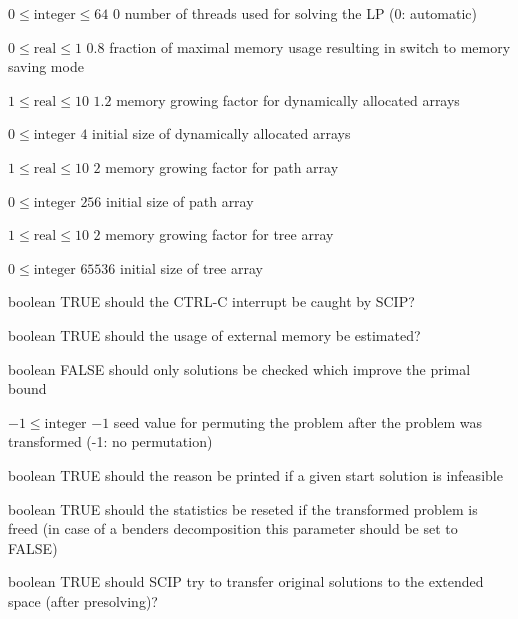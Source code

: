 %
{$0\leq\textrm{integer}\leq64$}%
{$0$}%
{number of threads used for solving the LP (0: automatic)}%
{}

%
{$0\leq\textrm{real}\leq1$}%
{$0.8$}%
{fraction of maximal memory usage resulting in switch to memory saving mode}%
{}

%
{$1\leq\textrm{real}\leq10$}%
{$1.2$}%
{memory growing factor for dynamically allocated arrays}%
{}

%
{$0\leq\textrm{integer}$}%
{$4$}%
{initial size of dynamically allocated arrays}%
{}

%
{$1\leq\textrm{real}\leq10$}%
{$2$}%
{memory growing factor for path array}%
{}

%
{$0\leq\textrm{integer}$}%
{$256$}%
{initial size of path array}%
{}

%
{$1\leq\textrm{real}\leq10$}%
{$2$}%
{memory growing factor for tree array}%
{}

%
{$0\leq\textrm{integer}$}%
{$65536$}%
{initial size of tree array}%
{}

%
{boolean}%
{TRUE}%
{should the CTRL-C interrupt be caught by SCIP?}%
{}

%
{boolean}%
{TRUE}%
{should the usage of external memory be estimated?}%
{}

%
{boolean}%
{FALSE}%
{should only solutions be checked which improve the primal bound}%
{}

%
{$-1\leq\textrm{integer}$}%
{$-1$}%
{seed value for permuting the problem after the problem was transformed (-1: no permutation)}%
{}

%
{boolean}%
{TRUE}%
{should the reason be printed if a given start solution is infeasible}%
{}

%
{boolean}%
{TRUE}%
{should the statistics be reseted if the transformed problem is freed (in case of a benders decomposition this parameter should be set to FALSE)}%
{}

%
{boolean}%
{TRUE}%
{should SCIP try to transfer original solutions to the extended space (after presolving)?}%
{}


